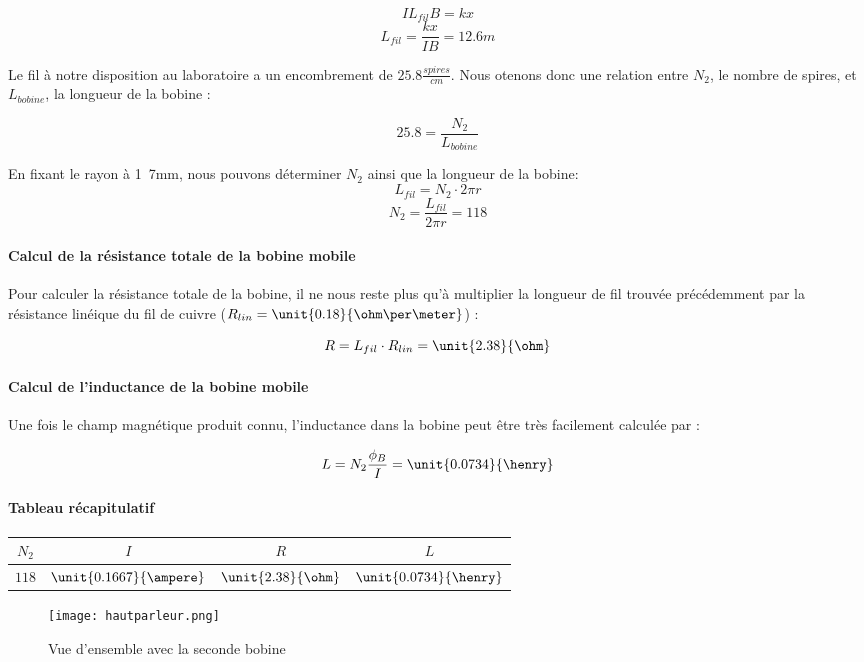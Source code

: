 $$IL_{fil}B = kx$$
$$L_{fil} = \frac{kx}{IB} = 12.6 m$$

Le fil à notre disposition au laboratoire a un encombrement de $\unit{25.8}{\frac{spires}{cm}}$. Nous otenons 
donc une relation entre $N_2$, le nombre de spires, et $L_{bobine}$, la longueur de la bobine :

$$25.8 = \frac{N_2}{L_{bobine}}$$

En fixant le rayon à \unit{1.7}{mm}, nous pouvons déterminer $N_2$ ainsi que la longueur de la bobine:
$$L_{fil} = N_2 \cdot 2\pi r$$ 
$$N_2 =  \frac{L_{fil}}{2\pi r} = 118$$

\paragraph{Calcul de la résistance totale de la bobine mobile}
Pour calculer la résistance totale de la bobine, il ne nous reste plus qu'à multiplier la longueur de fil trouvée 
précédemment par la résistance linéique du fil de cuivre
($R_{lin} = \unit{0.18}{\ohm\per\meter}$) :

$$R = L_{fil} \cdot R_{lin} = \unit{2.38}{\ohm}$$

\paragraph{Calcul de l'inductance de la bobine mobile}

Une fois le champ magnétique produit connu, l'inductance dans la bobine peut être très facilement calculée par :

$$L = N_2 \frac{\phi_B}{I} = \unit{0.0734}{\henry}$$

\paragraph{Tableau récapitulatif}

\begin{center}
	\begin{tabular}{c|c|c|c}
		$N_2$ & $I$ & $R$ & $L$ \\
		\hline
		 $118$ & $\unit{0.1667}{\ampere}$ & $\unit{2.38}{\ohm}$ & $\unit{0.0734}{\henry}$ \\
	\end{tabular}
\end{center}

\begin{figure}[ht!]
\centering
\texttt{[image: hautparleur.png]}
\caption{Vue d'ensemble avec la seconde bobine}
\label{Vue d'ensemble avec la seconde bobine}
\end{figure}

